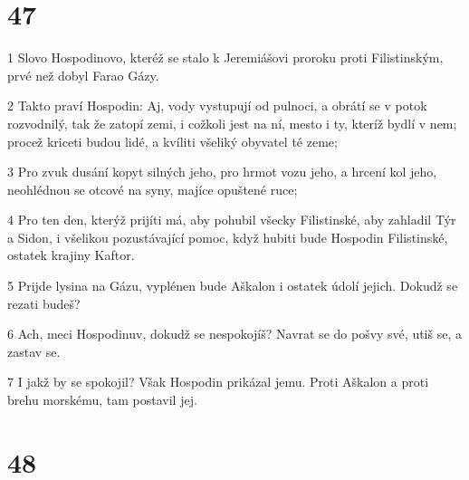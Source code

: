 \chapter{47}

\par 1 Slovo Hospodinovo, kteréž se stalo k Jeremiášovi proroku proti Filistinským, prvé než dobyl Farao Gázy.
\par 2 Takto praví Hospodin: Aj, vody vystupují od pulnoci, a obrátí se v potok rozvodnilý, tak že zatopí zemi, i cožkoli jest na ní, mesto i ty, kteríž bydlí v nem; procež kriceti budou lidé, a kvíliti všeliký obyvatel té zeme;
\par 3 Pro zvuk dusání kopyt silných jeho, pro hrmot vozu jeho, a hrcení kol jeho, neohlédnou se otcové na syny, majíce opuštené ruce;
\par 4 Pro ten den, kterýž prijíti má, aby pohubil všecky Filistinské, aby zahladil Týr a Sidon, i všelikou pozustávající pomoc, když hubiti bude Hospodin Filistinské, ostatek krajiny Kaftor.
\par 5 Prijde lysina na Gázu, vyplénen bude Aškalon i ostatek údolí jejich. Dokudž se rezati budeš?
\par 6 Ach, meci Hospodinuv, dokudž se nespokojíš? Navrat se do pošvy své, utiš se, a zastav se.
\par 7 I jakž by se spokojil? Však Hospodin prikázal jemu. Proti Aškalon a proti brehu morskému, tam postavil jej.

\chapter{48}

